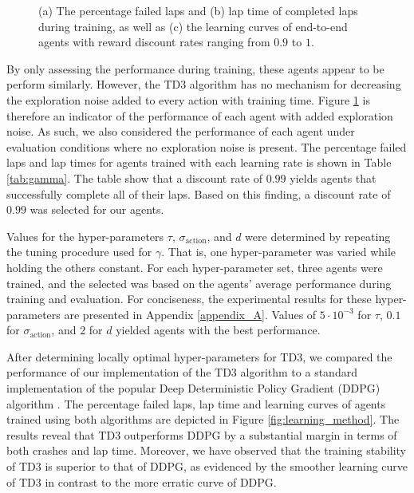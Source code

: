 \begin{figure}[htb!]
    \centering
    
    \caption[Learning curves for tuning reward discount rate]{(a) The percentage failed laps and (b) lap time of completed laps during training, as well as (c) the learning curves of end-to-end agents with reward discount rates ranging from $0.9$ to $1$.}
    \label{fig:gamma}
\end{figure}

By only assessing the performance during training, these agents appear to be perform similarly.
However, the TD3 algorithm has no mechanism for decreasing the exploration noise added to every action with training time.
Figure \ref{fig:gamma} is therefore an indicator of the performance of each agent with added exploration noise.
As such, we also considered the performance of each agent under evaluation conditions where no exploration noise is present.
The percentage failed laps and lap times for agents trained with each learning rate is shown in Table \ref{tab:gamma}.
The table show that a discount rate of $0.99$ yields agents that successfully complete all of their laps. 
Based on this finding, a discount rate of $0.99$ was selected for our agents.



Values for the hyper-parameters $\tau$, $\sigma_{\text{action}}$, and $d$ were determined by repeating the tuning procedure used for $\gamma$. 
That is, one hyper-parameter was varied while holding the others constant.
For each hyper-parameter set, three agents were trained, and the selected was based on the agents' average performance during training and evaluation. 
For conciseness, the experimental results for these hyper-parameters are presented in Appendix \ref{appendix_A}. 
Values of $5\cdot10^{-3}$ for $\tau$, $0.1$ for $\sigma_{\text{action}}$, and $2$ for $d$ yielded agents with the best performance.


After determining locally optimal hyper-parameters for TD3, we compared the performance of our implementation of the TD3 algorithm to a standard implementation of the popular Deep Deterministic Policy Gradient (DDPG) algorithm  \cite{Ivanov2020, Capo2020, Niu2020}.
The percentage failed laps, lap time and learning curves of agents trained using both algorithms are depicted in Figure \ref{fig:learning_method}.
The results reveal that TD3 outperforms DDPG by a substantial margin in terms of both crashes and lap time.
Moreover, we have observed that the training stability of TD3 is superior to that of DDPG, as evidenced by the smoother learning curve of TD3 in contrast to the more erratic curve of DDPG.

